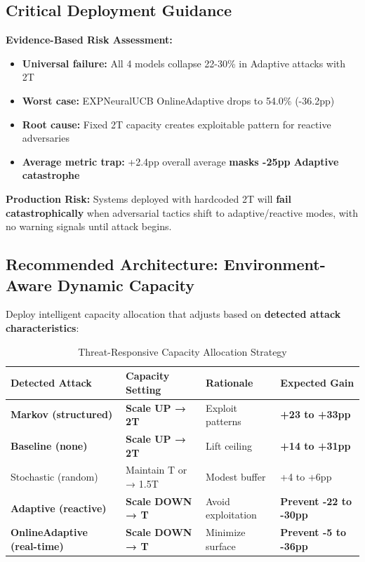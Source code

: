 \documentclass[11pt,a4paper]{article}
\newcommand{\critical}[1]{\textcolor{criticalcolor}{\textbf{#1}}}
\newcommand{\success}[1]{\textcolor{successcolor}{\textbf{#1}}}
\begin{document}
\subsection{Critical Deployment Guidance}

\begin{tcolorbox}
[colback=criticalcolor!10,colframe=criticalcolor,title=�� CRITICAL: Do Not Deploy Fixed 2T in Adversarial Environments]
\scriptsize
\textbf{Evidence-Based Risk Assessment:}
\begin{itemize}
    \item \textbf{Universal failure:} All 4 models collapse 22-30\% in Adaptive attacks with 2T
    \item \textbf{Worst case:} EXPNeuralUCB OnlineAdaptive drops to 54.0\% (-36.2pp)
    \item \textbf{Root cause:} Fixed 2T capacity creates exploitable pattern for reactive adversaries
    \item \textbf{Average metric trap:} +2.4pp overall average \critical{masks -25pp Adaptive catastrophe}
\end{itemize}

\textbf{Production Risk:} Systems deployed with hardcoded 2T will \critical{fail catastrophically} when adversarial tactics shift to adaptive/reactive modes, with no warning signals until attack begins.
\end{tcolorbox}

\subsection{Recommended Architecture: Environment-Aware Dynamic Capacity}

Deploy intelligent capacity allocation that adjusts based on \textbf{detected attack characteristics}:

\vspace{-0.4cm}
\begin{table}[h]
\scriptsize
\centering
\begin{tabular}{llll}
\toprule
\textbf{Detected Attack} & \textbf{Capacity Setting} & \textbf{Rationale} & \textbf{Expected Gain} \\
\midrule
\success{Markov (structured)} & \success{Scale UP → 2T} & Exploit patterns & \success{+23 to +33pp} \\
\success{Baseline (none)} & \success{Scale UP → 2T} & Lift ceiling & \success{+14 to +31pp} \\
Stochastic (random) & Maintain T or → 1.5T & Modest buffer & +4 to +6pp \\
\critical{Adaptive (reactive)} & \critical{Scale DOWN → T} & Avoid exploitation & \critical{Prevent -22 to -30pp} \\
\critical{OnlineAdaptive (real-time)} & \critical{Scale DOWN → T} & Minimize surface & \critical{Prevent -5 to -36pp} \\
\bottomrule
\end{tabular}
\vspace{-0.2cm}
\caption{Threat-Responsive Capacity Allocation Strategy}
\end{table}
\end{document}
